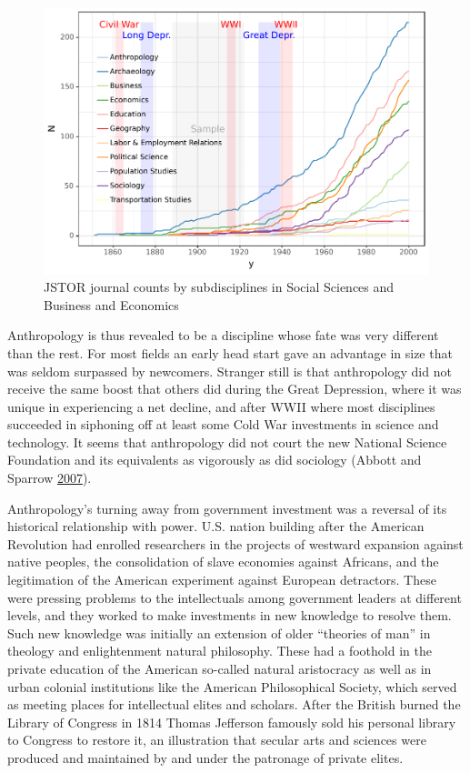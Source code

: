 \documentclass[]{book}
\theoremstyle{definition}
\theoremstyle{definition}
\theoremstyle{definition}
\theoremstyle{remark}
\begin{document}
\begin{figure}

{\centering \includegraphics[width=0.9\linewidth]{04_files/figure-latex/subdisc-1} 

}

\caption{JSTOR journal counts by subdisciplines in Social Sciences and Business and Economics}\label{fig:subdisc}
\end{figure}

Anthropology is thus revealed to be a discipline whose fate was very
different than the rest. For most fields an early head start gave an
advantage in size that was seldom surpassed by newcomers. Stranger still
is that anthropology did not receive the same boost that others did
during the Great Depression, where it was unique in experiencing a net
decline, and after WWII where most disciplines succeeded in siphoning
off at least some Cold War investments in science and technology. It
seems that anthropology did not court the new National Science
Foundation and its equivalents as vigorously as did sociology (Abbott
and Sparrow \protect\hyperlink{ref-Abbott2007Hot}{2007}).

Anthropology's turning away from government investment was a reversal of
its historical relationship with power. U.S. nation building after the
American Revolution had enrolled researchers in the projects of westward
expansion against native peoples, the consolidation of slave economies
against Africans, and the legitimation of the American experiment
against European detractors. These were pressing problems to the
intellectuals among government leaders at different levels, and they
worked to make investments in new knowledge to resolve them. Such new
knowledge was initially an extension of older ``theories of man'' in
theology and enlightenment natural philosophy. These had a foothold in
the private education of the American so-called natural aristocracy as
well as in urban colonial institutions like the American Philosophical
Society, which served as meeting places for intellectual elites and
scholars. After the British burned the Library of Congress in 1814
Thomas Jefferson famously sold his personal library to Congress to
restore it, an illustration that secular arts and sciences were produced
and maintained by and under the patronage of private elites.
\end{document}
